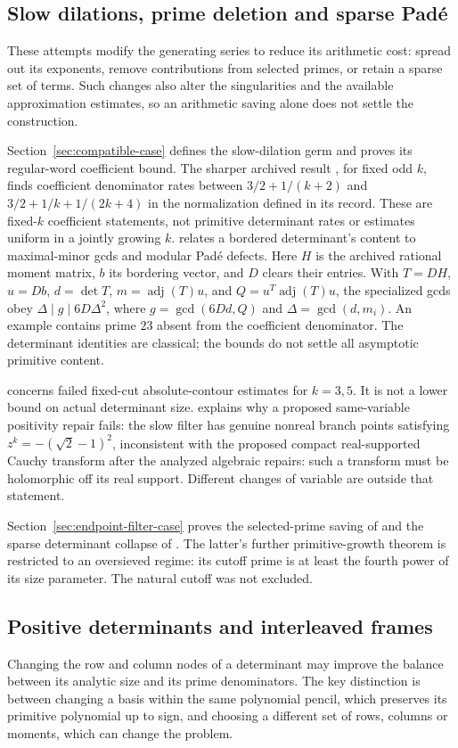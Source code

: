 \subsection{Slow dilations, prime deletion and sparse Pad\'e}
These attempts modify the generating series to reduce its arithmetic
cost: spread out its exponents, remove contributions from selected
primes, or retain a sparse set of terms. Such changes also alter the
singularities and the available approximation estimates, so an arithmetic
saving alone does not settle the construction.

Section~\ref{sec:compatible-case} defines the slow-dilation germ and
proves its regular-word coefficient bound. The sharper archived result
, for fixed odd $k$, finds coefficient
denominator rates between $3/2+1/(k+2)$ and
$3/2+1/k+1/(2k+4)$ in the normalization defined in its record.
These are fixed-$k$ coefficient statements, not primitive determinant
rates or estimates uniform in a jointly growing $k$.
 relates a bordered determinant's content to maximal-minor gcds
and modular Pad\'e defects. Here $H$ is the archived rational moment
matrix, $b$ its bordering vector, and $D$ clears their entries.
With $T=DH$, $u=Db$,
$d=\det T$, $m=\operatorname{adj}(T)u$, and
$Q=u^T\operatorname{adj}(T)u$, the specialized gcds obey
$\Delta\mid g\mid6D\Delta^2$, where
$g=\gcd(6Dd,Q)$ and $\Delta=\gcd(d,m_i)$.
An example contains prime $23$ absent from the coefficient denominator.
The determinant identities are classical; the bounds do not settle
all asymptotic primitive content.

 concerns failed fixed-cut absolute-contour estimates for $k=3,5$.
It is not a lower bound on actual determinant size.  explains why
a proposed same-variable positivity repair fails: the slow filter has
genuine nonreal branch points satisfying
$z^k=-(\sqrt2-1)^2$, inconsistent with the proposed compact
real-supported Cauchy transform after the analyzed algebraic repairs:
such a transform must be holomorphic off its real support.
Different changes of variable are outside that statement.

Section~\ref{sec:endpoint-filter-case} proves the selected-prime saving
of  and the sparse determinant collapse of .
The latter's further primitive-growth theorem is restricted to an
oversieved regime: its cutoff prime is at least the fourth power of
its size parameter. The natural cutoff was not excluded.

\subsection{Positive determinants and interleaved frames}\label{sec:interleaved}
Changing the row and column nodes of a determinant may improve the
balance between its analytic size and its prime denominators. The key
distinction is between changing a basis within the same polynomial
pencil, which preserves its primitive polynomial up to sign, and choosing a
different set of rows, columns or moments, which can change the problem.

